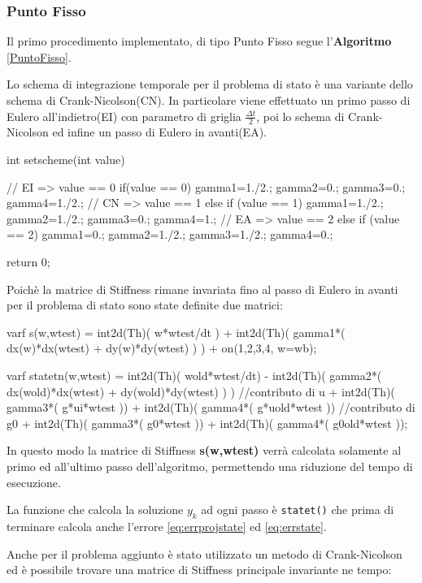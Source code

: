 \subsubsection{Punto Fisso}
Il primo procedimento implementato, di tipo Punto Fisso segue l'\textbf{Algoritmo} \ref{PuntoFisso}.
\par
Lo schema di integrazione temporale per il problema di stato è una variante dello schema di Crank-Nicolson(CN). In particolare viene effettuato un primo passo di Eulero all'indietro(EI) con parametro di griglia $\frac{{\Delta}t}{2}$, poi lo schema di Crank-Nicolson ed infine un passo di Eulero in avanti(EA).
\begin{Code}[caption={Funzione \texttt{setscheme()}}]
int setscheme(int value)
{
	// EI => value == 0
	if(value == 0)
	{
	    gamma1=1./2.;
	    gamma2=0.;
	    gamma3=0.;
	    gamma4=1./2.;
	}
	// CN => value == 1
	else if (value == 1)
	{	
		gamma1=1./2.;
	    gamma2=1./2.;
	    gamma3=0.;
	    gamma4=1.;
	}
	// EA => value == 2
	else if (value == 2)
	{
		gamma1=0.;
	    gamma2=1./2.;
	    gamma3=1./2.;
	    gamma4=0.;
	}
	
	return 0;
}
\end{Code}
Poichè la matrice di Stiffness rimane invariata fino al passo di Eulero in avanti per il problema di stato sono state definite due matrici:
\begin{Code}[caption={Matrici \texttt{s(w,wtest)} e \texttt{statetn(w,wtest)}}]
varf s(w,wtest) =   int2d(Th)( w*wtest/dt )
	        	  + int2d(Th)( gamma1*( dx(w)*dx(wtest) + dy(w)*dy(wtest) ) )
				  + on(1,2,3,4, w=wb);

varf statetn(w,wtest) =   int2d(Th)( wold*wtest/dt)
				  		- int2d(Th)( gamma2*(   dx(wold)*dx(wtest) 
				  							 + dy(wold)*dy(wtest) ) )
							//contributo di u
						+ int2d(Th)( gamma3*( g*ui*wtest ))
				 		+ int2d(Th)( gamma4*( g*uold*wtest ))
							//contributo di g0
						+ int2d(Th)( gamma3*( g0*wtest ))
				 		+ int2d(Th)( gamma4*( g0old*wtest ));
\end{Code}
In questo modo la matrice di Stiffness \textbf{s(w,wtest)} verrà calcolata solamente al primo ed all'ultimo passo dell'algoritmo, permettendo una riduzione del tempo di esecuzione.
\par
La funzione che calcola la soluzione $y_k$ ad ogni passo è \texttt{statet()} che prima di terminare calcola anche l'errore \eqref{eq:errprojstate} ed \eqref{eq:errstate}.
\par
Anche per il problema aggiunto è stato utilizzato un metodo di Crank-Nicolson ed è possibile trovare una matrice di Stiffness principale invariante ne tempo:
